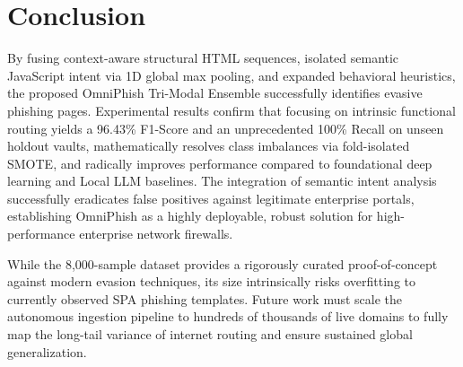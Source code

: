 \documentclass[conference]{IEEEtran}
\begin{document}
\section{Conclusion}
By fusing context-aware structural HTML sequences, isolated semantic JavaScript intent via 1D global max pooling, and expanded behavioral heuristics, the proposed OmniPhish Tri-Modal Ensemble successfully identifies evasive phishing pages. Experimental results confirm that focusing on intrinsic functional routing yields a 96.43\% F1-Score and an unprecedented 100\% Recall on unseen holdout vaults, mathematically resolves class imbalances via fold-isolated SMOTE, and radically improves performance compared to foundational deep learning and Local LLM baselines. The integration of semantic intent analysis successfully eradicates false positives against legitimate enterprise portals, establishing OmniPhish as a highly deployable, robust solution for high-performance enterprise network firewalls.

While the 8,000-sample dataset provides a rigorously curated proof-of-concept against modern evasion techniques, its size intrinsically risks overfitting to currently observed SPA phishing templates. Future work must scale the autonomous ingestion pipeline to hundreds of thousands of live domains to fully map the long-tail variance of internet routing and ensure sustained global generalization.
\end{document}
